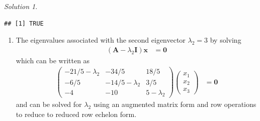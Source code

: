 \documentclass[
]{book}
\newenvironment{Shaded}{\begin{snugshade}}{\end{snugshade}}
\newcommand{\CommentTok}[1]{\textcolor[rgb]{0.56,0.35,0.01}{\textit{#1}}}
\newcommand{\DecValTok}[1]{\textcolor[rgb]{0.00,0.00,0.81}{#1}}
\newcommand{\KeywordTok}[1]{\textcolor[rgb]{0.13,0.29,0.53}{\textbf{#1}}}
\newcommand{\NormalTok}[1]{#1}
\newcommand{\OperatorTok}[1]{\textcolor[rgb]{0.81,0.36,0.00}{\textbf{#1}}}
\newcommand{\StringTok}[1]{\textcolor[rgb]{0.31,0.60,0.02}{#1}}
\providecommand{\tightlist}{%
  \setlength{\itemsep}{0pt}\setlength{\parskip}{0pt}}
\theoremstyle{definition}
\theoremstyle{definition}
\theoremstyle{definition}
\theoremstyle{definition}
\theoremstyle{remark}
\newtheorem*{solution}{Solution}
\begin{document}
\begin{solution}
\begin{Shaded}
\end{Shaded}

\begin{verbatim}
## [1] TRUE
\end{verbatim}

\begin{enumerate}
\def\labelenumi{\alph{enumi})}
\setcounter{enumi}{1}
\tightlist
\item
  The eigenvalues associated with the second eigenvector \(\lambda_2 = 3\) by solving
  \[
  \begin{aligned}
  \left( \mathbf{A} - \lambda_2 \mathbf{I} \right) \mathbf{x} & = \mathbf{0}
  \end{aligned}
  \]
  which can be written as
  \[
  \begin{aligned}
  \begin{pmatrix} 
  -21/5  - \lambda_2 & -34/5 & 18/5 \\
  -6/5 & -14/5 - \lambda_2 & 3/5 \\
  -4 & -10 & 5 - \lambda_2
  \end{pmatrix} \begin{pmatrix} x_1 \\ x_2 \\ x_3 \end{pmatrix} & = \mathbf{0}
  \end{aligned}
  \]
  and can be solved for \(\lambda_2\) using an augmented matrix form and row operations to reduce to reduced row echelon form.
\end{enumerate}


\end{solution}
\end{document}
